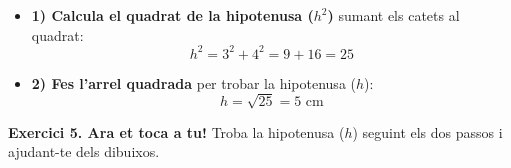 \documentclass[12pt,a4paper]{article}
\begin{document}
\vspace{0.3cm}
\begin{minipage}{0.4\textwidth}
    \begin{center}
    \end{center}
\end{minipage}
\begin{minipage}{0.55\textwidth}
    \begin{itemize}
        \item \textbf{1) Calcula el quadrat de la hipotenusa ($h^2$)} sumant els catets al quadrat:
        $$h^2 = 3^2 + 4^2 = 9 + 16 = 25$$
        \item \textbf{2) Fes l'arrel quadrada} per trobar la hipotenusa ($h$):
        $$h = \sqrt{25} = 5\text{ cm}$$
    \end{itemize}
\end{minipage}

\vspace{0.8cm}
\textbf{Exercici 5. Ara et toca a tu!} Troba la hipotenusa ($h$) seguint els dos passos i ajudant-te dels dibuixos.
\end{document}
